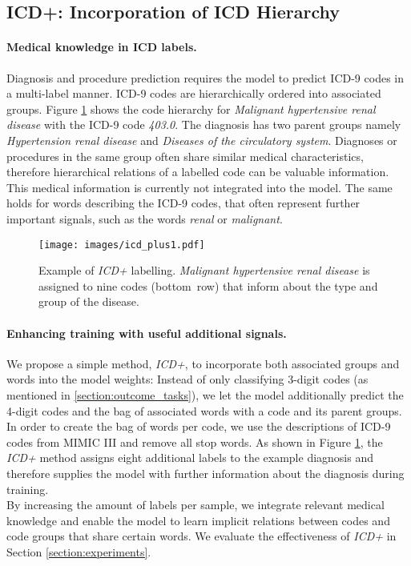 \documentclass[11pt,a4paper]{article}
\begin{document}
\subsection{ICD+: Incorporation of ICD Hierarchy} 
\paragraph{Medical knowledge in ICD labels.} Diagnosis and procedure prediction requires the model to predict ICD-9 codes in a multi-label manner. ICD-9 codes are hierarchically ordered into associated groups. Figure \ref{fig:icd_plus} shows the  code hierarchy for \textit{Malignant hypertensive renal disease} with the ICD-9 code \textit{403.0}. The diagnosis has two parent groups namely \textit{Hypertension renal disease} and \textit{Diseases of the circulatory system}.
Diagnoses or procedures in the same group often share similar medical characteristics, therefore hierarchical relations of a labelled code can be valuable information. This medical information is currently not integrated into the model. The same holds for words describing the ICD-9 codes, that often represent further important signals, such as the words \textit{renal} or \textit{malignant}.
\begin{figure}[t!]
  \texttt{[image: images/icd\_plus1.pdf]}
  \caption{Example of \textit{ICD+} labelling. \textit{Malignant hypertensive renal disease} is assigned to nine codes \hbox{(bottom row)} that inform about the type and group of the disease.}
\label{fig:icd_plus}
\end{figure}
\paragraph{Enhancing training with useful additional \hbox{signals}.}
We propose a simple method, \textit{ICD+}, to incorporate both associated groups and words into the model weights: Instead of only classifying 3-digit codes (as mentioned in \ref{section:outcome_tasks}), we let the model additionally predict the 4-digit codes and the bag of associated words with a code and its parent groups. In order to create the bag of words per code, we use the descriptions of ICD-9 codes from MIMIC III and remove all stop words. As shown in Figure \ref{fig:icd_plus}, the \textit{ICD+} method assigns eight additional labels to the example diagnosis and therefore supplies the model with  further information about the diagnosis during training.\\By increasing the amount of labels per sample, we integrate relevant medical knowledge and enable the model to learn implicit relations between codes and code groups that share certain words. We evaluate the effectiveness of \textit{ICD+} in Section \ref{section:experiments}.
\end{document}
